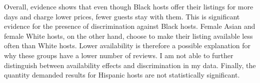 Overall, evidence shows that even though Black hosts offer their listings for more days and charge lower prices, fewer guests stay with them. This is significant evidence for the presence of discrimination against Black hosts. Female Asian and female White hosts, on the other hand, choose to make their listing available less often than White hosts. Lower availability is therefore a possible explanation for why these groups have a lower number of reviews. I am not able to further distinguish between availability effects and discrimination in my data. Finally, the quantity demanded results for Hispanic hosts are not statistically significant.














